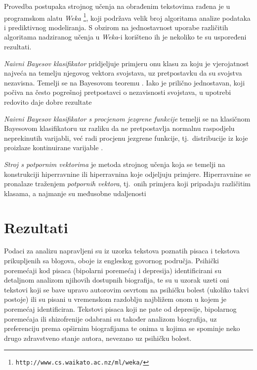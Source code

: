 \documentclass[10pt, a4paper]{article}
\begin{document}
Provedba postupaka strojnog učenja na obrađenim tekstovima rađena je u programskom alatu \emph{Weka} \footnote{\texttt{http://www.cs.waikato.ac.nz/ml/weka/}}, koji podržava velik broj algoritama analize podataka i prediktivnog modeliranja. S obzirom na jednostavnost uporabe različitih algoritama nadziranog učenja u \emph{Weka}-i korišteno ih je nekoliko te su uspoređeni rezultati.  

\emph{Naivni Bayesov klasifikator} pridjeljuje primjeru onu klasu za koju je vjerojatnost najveća na temelju njegovog vektora svojstava, uz pretpostavku da su svojstva nezavisna. Temelji se na Bayesovom teoremu \citep{bayes-63}. Iako je prilično jednostavan, koji počiva na često pogrešnoj pretpostavci o nezavisnosti svojstava, u upotrebi redovito daje dobre rezultate \citep{hand-yu}

\emph{Naivni Bayesov klasifikator s procjenom jezgrene funkcije} temelji se na klasičnom Bayesovom klasifikatoru uz razliku da ne pretpostavlja normalnu raspodjelu neprekinutih varijabli, već radi procjenu jezgrene funkcije, tj.~distribucije iz koje proizlaze kontinuirane varijable \citep{john-95}.

\emph{Stroj s potpornim vektorima}  je metoda strojnog učenja koja se temelji na konstrukciji hiperravnine ili hiperravnina koje odjeljuju primjere. Hiperravnine se pronalaze traženjem \emph{potpornih vektora}, tj.~onih primjera koji pripadaju različitim klasama, a najmanje su međusobne udaljenosti \citep{cortes-vap}



\section{Rezultati}

Podaci za analizu napravljeni su iz uzorka tekstova poznatih pisaca i tekstova prikupljenih sa blogova, oboje iz engleskog govornog područja. Psihički poremećaji kod pisaca (bipolarni poremećaj i depresija) identificirani su detaljnom analizom njihovih dostupnih biografija, te su u uzorak uzeti oni tekstovi koji se bave upravo autorovim osvrtom na psihičku bolest (ukoliko takvi postoje) ili su pisani u vremenskom razdoblju najbližem onom u kojem je poremećaj identificiran. Tekstovi pisaca koji ne pate od depresije, bipolarnog poremećaja ili shizofrenije odabrani su također analizom biografija, uz preferenciju prema opširnim biografijama te onima u kojima se spominje neko drugo zdravstveno stanje autora, nevezano uz psihičku bolest.
\end{document}
